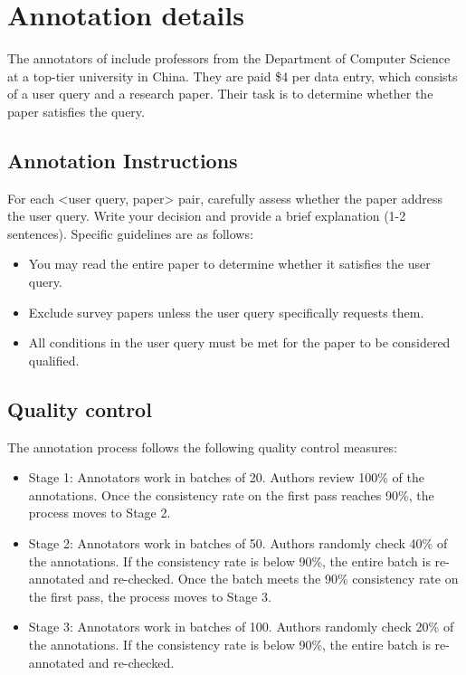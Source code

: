 \section{Annotation details}\label{annotation_details}

The annotators of \realS include professors from the Department of Computer Science at a top-tier university in China. They are paid \$4 per data entry, which consists of a user query and a research paper. Their task is to determine whether the paper satisfies the query. 

\subsection{Annotation Instructions}
For each <user query, paper> pair, carefully assess whether the paper address the user query. Write your decision and provide a brief explanation (1-2 sentences). Specific guidelines are as follows:
\begin{itemize}
    \item You may read the entire paper to determine whether it satisfies the user query.
    \item Exclude survey papers unless the user query specifically requests them.
    \item All conditions in the user query must be met for the paper to be considered qualified.
\end{itemize}

\subsection{Quality control}

The annotation process follows the following quality control measures:

\begin{itemize}
    \item Stage 1: Annotators work in batches of 20. Authors review 100\% of the annotations. Once the consistency rate on the first pass reaches 90\%, the process moves to Stage 2.

    \item Stage 2: Annotators work in batches of 50. Authors randomly check 40\% of the annotations. If the consistency rate is below 90\%, the entire batch is re-annotated and re-checked. Once the batch meets the 90\% consistency rate on the first pass, the process moves to Stage 3.

    \item Stage 3: Annotators work in batches of 100. Authors randomly check 20\% of the annotations. If the consistency rate is below 90\%, the entire batch is re-annotated and re-checked.
\end{itemize}

